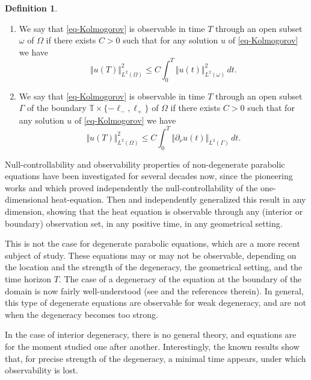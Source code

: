 \documentclass[10pt]{amsart}
\theoremstyle{plain}
\theoremstyle{definition}
\newtheorem{definition}[theorem]{Definition}
\newcommand{\nr}[1]{\Vert #1\Vert}
\newcommand{\1}{\mathds 1}
\newcommand{\T}{\mathbb{T}}
\let\G\Gamma
\let\o\omega
\let\O\Omega
\begin{document}
\skpt
\begin{definition}
\begin{enumerate}
\item We say that \eqref{eq-Kolmogorov} is observable in time $T$ through an open subset $\omega$ of $\O$ if there exists $C > 0$ such that for any solution $u$ of \eqref{eq-Kolmogorov} we have
\begin{equation} \label{eq-obs-vol}
\nr{u(T)}_{L^2(\O)}^2 \leq C \int_0^T \nr{u(t)}_{L^2(\o)}^2 \, dt.
\end{equation}
\item We say that \eqref{eq-Kolmogorov} is observable in time $T$ through an open subset $\Gamma$ of the boundary $\T \times \{-\ell_-,\ell_+\}$ of $\O$ if there exists $C > 0$ such that for any solution $u$ of \eqref{eq-Kolmogorov} we have
\begin{equation} \label{eq-obs-Gamma}
\nr{u(T)}_{L^2(\O)}^2 \leq C \int_0^T \nr{\partial_\nu u(t)}_{L^2(\G)} \, dt.
\end{equation}
\end{enumerate}
\end{definition}

Null-controllability and observability properties of non-degenerate parabolic equations have been investigated
for several decades now, since the pioneering works \cite{egorov} and \cite{fattorini_russel} which proved independently the null-controllability of the one-dimensional heat-equation. Then \cite{Lebeau_Robbiano}
and \cite{Fursikov_Imanuvilov} independently generalized this result in any dimension, showing
that the heat equation is observable through any (interior or boundary) observation set, in any positive time, in any
geometrical setting.

This is not the case for degenerate parabolic equations, which are a more recent subject of study. These equations
may or may not be observable, depending on the location and the strength of the degeneracy, the geometrical setting, and the time horizon $T$.
The case of a degeneracy of the equation at the boundary of the domain
is now fairly well-understood (see \cite{Cannarsa_Martinez_Vancostenoble} and the references therein). In general, this type of degenerate equations are observable for weak degeneracy, and are not when the degeneracy becomes too strong.

In the case of interior
degeneracy, there is no general theory, and equations are for the moment studied one after another.
Interestingly, the known results show that, for precise strength of the degeneracy, a minimal time
appears, under which observability is lost.
\end{document}
